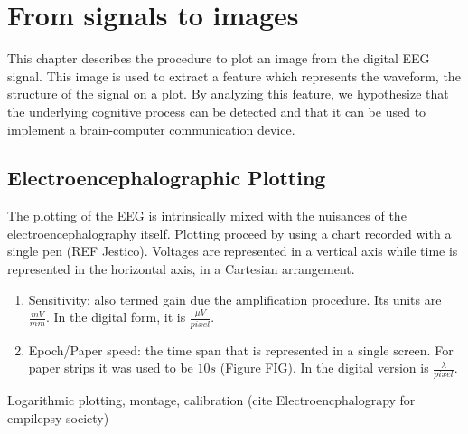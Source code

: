 \chapter{From signals to images}
\label{chapter:two}


This chapter describes the procedure to plot an image from the digital EEG signal.  This image is used to extract a feature which represents the waveform, the structure of the signal on a plot.  By analyzing this feature, we hypothesize that the underlying cognitive process can be detected and that it can be used to implement a brain-computer communication device.

\section{Electroencephalographic Plotting}

The plotting of the EEG is intrinsically mixed with the nuisances of the electroencephalography itself.  Plotting proceed by using a chart recorded with a single pen (REF Jestico).   Voltages are represented in a vertical axis while time is represented in the horizontal axis, in a Cartesian arrangement. 

\begin{enumerate}
\item Sensitivity: also termed gain due the amplification procedure.  Its units are $ \frac{mV}{mm}$.  In the digital form, it is $\frac{\mu V}{pixel}$.
\item Epoch/Paper speed: the time span that is represented in a single screen.  For paper strips it was used to be $10s$ (Figure FIG).  In the digital version is $ \frac{\lambda}{pixel}$.
\end{enumerate}

Logarithmic plotting, montage, calibration (cite Electroencphalograpy for empilepsy society)


